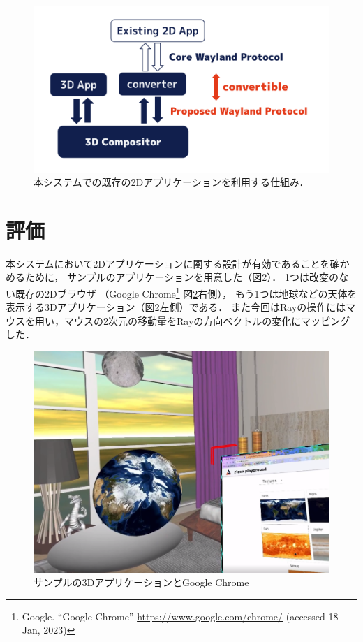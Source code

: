 \begin{figure}[htbp]
  \centering
  \includegraphics[keepaspectratio, width=0.9\linewidth]{figures/dnd-architecture.png}
  \caption{
    本システムでの既存の2Dアプリケーションを利用する仕組み．
  }
  \label{fig:dnd-architecture}
\end{figure}

\section{評価}

本システムにおいて2Dアプリケーションに関する設計が有効であることを確かめるために，
サンプルのアプリケーションを用意した（図\ref{fig:dnd-apps}）．
1つは改変のない既存の2Dブラウザ
（Google Chrome\footnote{Google. ``Google Chrome'' \url{https://www.google.com/chrome/} (accessed 18 Jan, 2023)}
図\ref{fig:dnd-apps}右側），
もう1つは地球などの天体を表示する3Dアプリケーション（図\ref{fig:dnd-apps}左側）である．
また今回はRayの操作にはマウスを用い，マウスの2次元の移動量をRayの方向ベクトルの変化にマッピングした．

\begin{figure}[htbp]
  \centering
  \includegraphics[keepaspectratio, width=0.9\linewidth]{figures/dnd-apps.png}
  \caption{
    サンプルの3DアプリケーションとGoogle Chrome
  }
  \label{fig:dnd-apps}
\end{figure}


